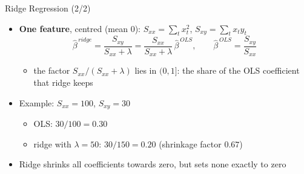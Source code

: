 \begin{frame}{Ridge Regression (2/2)}
\itemsize{\small}
\begin{itemize}
    \item \textbf{One feature}, centred (mean 0): $S_{xx} = \sum_t x_t^2$, $S_{xy} = \sum_t x_ty_t$ \[ \hat\beta^{\,ridge} = \dfrac{S_{xy}}{S_{xx} + \lambda} = \dfrac{S_{xx}}{S_{xx} + \lambda}\,\hat\beta^{\,OLS}, \qquad \hat\beta^{\,OLS} = \dfrac{S_{xy}}{S_{xx}} \]
    \begin{itemize}
        \item the factor $S_{xx}/(S_{xx} + \lambda)$ lies in $(0, 1]$: the share of the OLS coefficient that ridge keeps
    \end{itemize}
    \item Example: $S_{xx} = 100$, $S_{xy} = 30$
    \begin{itemize}
        \item OLS: $30/100 = 0.30$
        \item ridge with $\lambda = 50$: $30/150 = 0.20$ (shrinkage factor $0.67$)
    \end{itemize}
    \item Ridge shrinks all coefficients towards zero, but sets none exactly to zero
\end{itemize}
\end{frame}

